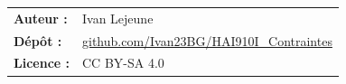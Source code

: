\begin{titlepage}
    \vfill

    \raggedright
    \small
    \begin{tabular}{@{} l l @{}}
        \textbf{Auteur :} & Ivan Lejeune \\
        \textbf{Dépôt :} & \href{https://github.com/Ivan23BG/HAI910I_Contraintes}{\color{exocolor}github.com/Ivan23BG/HAI910I\_Contraintes} \\ 
        \textbf{Licence :} & \color{fallbackcolor} CC BY-SA 4.0
    \end{tabular}

    \clearpage
\end{titlepage}
\pagecolor{bgcolor} %